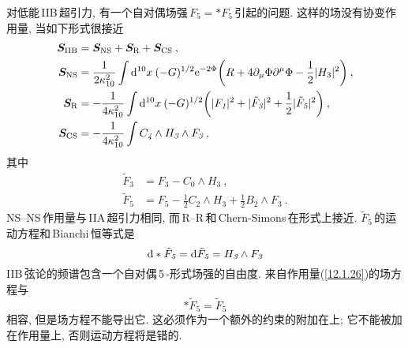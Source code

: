 对低能\,IIB\,超引力, 有一个自对偶场强$\,F_{\textit{5}}=\ast F_{\textit{5}}\,$引起的问题. 这样的场没有协变作用量, 当如下形式很接近
\begin{subequations}
\begin{align}
    \bm{S}_{\text{IIB}}&=\bm{S}_{\text{NS}}+\bm{S}_{\text{R}}+\bm{S}_{\text{CS}} \:, \label{12.1.26a} \\
    \bm{S}_{\text{NS}}&=\frac{1}{2\kappa_{10}^{2}}\int\mathrm{d}^{10}x\:(-G)^{1/2}\mathrm{e}^{-2\Phi}
    \biggl(R+4\partial_{\mu}\Phi\partial^{\mu}\Phi-\frac{1}{2}\lvert H_{3}\rvert^{2}\biggr) \:,\label{12.1.26b} \\
    \bm{S}_{\text{R}}&=- \frac{1}{4\kappa_{10}^{2}} \int \mathrm{d}^{10}x\:(-G)^{1/2}\biggl(\lvert F_{\textit{1}}\rvert^{2}+\lvert\tilde{F}_{\textit{3}}\rvert^{2}+\frac{1}{2}\lvert\tilde{F}_{\textit{5}}\rvert^{2}\biggr) \:, \label{12.1.26c} \\
    \bm{S}_{\text{CS}}&=-\frac{1}{4\kappa_{10}^{2}}\int C_{\textit{4}}\wedge H_{\textit{3}}\wedge F_{\textit{3}} \:,
\end{align} \label{12.1.26}
\end{subequations}
其中
\begin{subequations}
\begin{align}
    \tilde{F}_{\textit{3}} &= F_{\textit{3}}- C_{\textit{0}}\wedge H_{\textit{3}} \:, \label{12.1.27a}\\
    \tilde{F}_{\textit{5}} &= F_{\textit{5}} -\frac{1}{2}C_{\textit{2}}\wedge H_{\textit{3}} +\frac{1}{2}B_{\textit{2}}\wedge F_{\textit{3}} \:. \label{12.1.27b}
\end{align}  \label{12.1.27}
\end{subequations}
NS--NS\,作用量与\,IIA\,超引力相同, 而\,R--R\,和\,Chern-Simons\,在形式上接近. $\tilde{F}_{5}\,$的运动方程和\,Bianchi\,恒等式是
\begin{equation}
    \mathrm{d} \ast \tilde{F}_{\textit{5}} =\mathrm{d}\tilde{F}_{\textit{5}}=H_{\textit{3}}\wedge F_{\textit{3}}
\end{equation}
IIB\,弦论的频谱包含一个自对偶\,5\,-形式场强的自由度. 来自作用量(\ref{12.1.26})的场方程与
\begin{equation}
    \ast\tilde{F}_{\textit{5}} =\tilde{F}_{\textit{5}}
\end{equation}
相容, 但是场方程不能导出它. 这必须作为一个额外的约束的附加在{}上; 它不能被加在作用量上, 否则运动方程将是错的.

